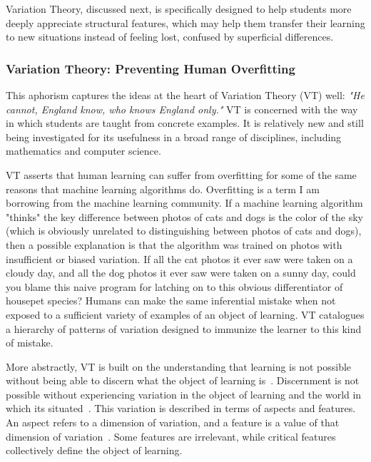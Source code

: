 Variation Theory, discussed next, is specifically designed to help students more deeply appreciate structural features, which may help them transfer their learning to new situations instead of feeling lost, confused by superficial differences.

\subsubsection{Variation Theory: Preventing Human Overfitting}

This aphorism captures the ideas at the heart of Variation Theory (VT) well: {\it "He cannot, England know, who knows England only."} VT is concerned with the way in which students are taught from concrete examples. It is relatively new and still being investigated for its usefulness in a broad range of disciplines, including mathematics and computer science. 

VT asserts that human learning can suffer from overfitting for some of the same reasons that machine learning algorithms do. Overfitting is a term I am borrowing from the machine learning community. If a machine learning algorithm "thinks" the key difference between photos of cats and dogs is the color of the sky (which is obviously unrelated to distinguishing between photos of cats and dogs), then a possible explanation is that the algorithm was trained on photos with insufficient or biased variation. If all the cat photos it ever saw were taken on a cloudy day, and all the dog photos it ever saw were taken on a sunny day, could you blame this naive program for latching on to this obvious differentiator of housepet species? Humans can make the same inferential mistake when not exposed to a sufficient variety of examples of an object of learning. VT catalogues a hierarchy of patterns of variation designed to immunize the learner to this kind of mistake.

More abstractly, VT is built on the understanding that learning is not possible without being able to discern what the object of learning is~\cite{marton1997learning}. Discernment is not possible without experiencing variation in the object of learning and the world in which its situated~\cite{marton2004classroom}. This variation is described in terms of aspects and features. An aspect refers to a dimension of variation, and a feature is a value of that dimension of variation~\cite{ling2012variation}. Some features are irrelevant, while critical features collectively define the object of learning.

